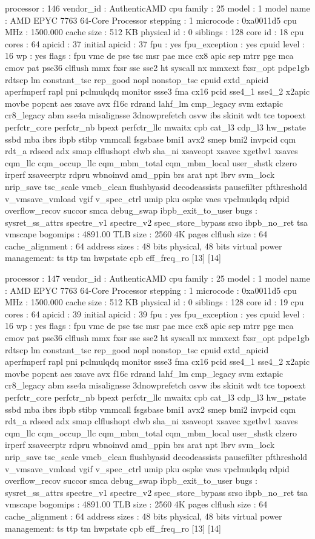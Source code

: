 processor	: 146
vendor_id	: AuthenticAMD
cpu family	: 25
model		: 1
model name	: AMD EPYC 7763 64-Core Processor
stepping	: 1
microcode	: 0xa0011d5
cpu MHz		: 1500.000
cache size	: 512 KB
physical id	: 0
siblings	: 128
core id		: 18
cpu cores	: 64
apicid		: 37
initial apicid	: 37
fpu		: yes
fpu_exception	: yes
cpuid level	: 16
wp		: yes
flags		: fpu vme de pse tsc msr pae mce cx8 apic sep mtrr pge mca cmov pat pse36 clflush mmx fxsr sse sse2 ht syscall nx mmxext fxsr_opt pdpe1gb rdtscp lm constant_tsc rep_good nopl nonstop_tsc cpuid extd_apicid aperfmperf rapl pni pclmulqdq monitor ssse3 fma cx16 pcid sse4_1 sse4_2 x2apic movbe popcnt aes xsave avx f16c rdrand lahf_lm cmp_legacy svm extapic cr8_legacy abm sse4a misalignsse 3dnowprefetch osvw ibs skinit wdt tce topoext perfctr_core perfctr_nb bpext perfctr_llc mwaitx cpb cat_l3 cdp_l3 hw_pstate ssbd mba ibrs ibpb stibp vmmcall fsgsbase bmi1 avx2 smep bmi2 invpcid cqm rdt_a rdseed adx smap clflushopt clwb sha_ni xsaveopt xsavec xgetbv1 xsaves cqm_llc cqm_occup_llc cqm_mbm_total cqm_mbm_local user_shstk clzero irperf xsaveerptr rdpru wbnoinvd amd_ppin brs arat npt lbrv svm_lock nrip_save tsc_scale vmcb_clean flushbyasid decodeassists pausefilter pfthreshold v_vmsave_vmload vgif v_spec_ctrl umip pku ospke vaes vpclmulqdq rdpid overflow_recov succor smca debug_swap ibpb_exit_to_user
bugs		: sysret_ss_attrs spectre_v1 spectre_v2 spec_store_bypass srso ibpb_no_ret tsa vmscape
bogomips	: 4891.00
TLB size	: 2560 4K pages
clflush size	: 64
cache_alignment	: 64
address sizes	: 48 bits physical, 48 bits virtual
power management: ts ttp tm hwpstate cpb eff_freq_ro [13] [14]

processor	: 147
vendor_id	: AuthenticAMD
cpu family	: 25
model		: 1
model name	: AMD EPYC 7763 64-Core Processor
stepping	: 1
microcode	: 0xa0011d5
cpu MHz		: 1500.000
cache size	: 512 KB
physical id	: 0
siblings	: 128
core id		: 19
cpu cores	: 64
apicid		: 39
initial apicid	: 39
fpu		: yes
fpu_exception	: yes
cpuid level	: 16
wp		: yes
flags		: fpu vme de pse tsc msr pae mce cx8 apic sep mtrr pge mca cmov pat pse36 clflush mmx fxsr sse sse2 ht syscall nx mmxext fxsr_opt pdpe1gb rdtscp lm constant_tsc rep_good nopl nonstop_tsc cpuid extd_apicid aperfmperf rapl pni pclmulqdq monitor ssse3 fma cx16 pcid sse4_1 sse4_2 x2apic movbe popcnt aes xsave avx f16c rdrand lahf_lm cmp_legacy svm extapic cr8_legacy abm sse4a misalignsse 3dnowprefetch osvw ibs skinit wdt tce topoext perfctr_core perfctr_nb bpext perfctr_llc mwaitx cpb cat_l3 cdp_l3 hw_pstate ssbd mba ibrs ibpb stibp vmmcall fsgsbase bmi1 avx2 smep bmi2 invpcid cqm rdt_a rdseed adx smap clflushopt clwb sha_ni xsaveopt xsavec xgetbv1 xsaves cqm_llc cqm_occup_llc cqm_mbm_total cqm_mbm_local user_shstk clzero irperf xsaveerptr rdpru wbnoinvd amd_ppin brs arat npt lbrv svm_lock nrip_save tsc_scale vmcb_clean flushbyasid decodeassists pausefilter pfthreshold v_vmsave_vmload vgif v_spec_ctrl umip pku ospke vaes vpclmulqdq rdpid overflow_recov succor smca debug_swap ibpb_exit_to_user
bugs		: sysret_ss_attrs spectre_v1 spectre_v2 spec_store_bypass srso ibpb_no_ret tsa vmscape
bogomips	: 4891.00
TLB size	: 2560 4K pages
clflush size	: 64
cache_alignment	: 64
address sizes	: 48 bits physical, 48 bits virtual
power management: ts ttp tm hwpstate cpb eff_freq_ro [13] [14]

